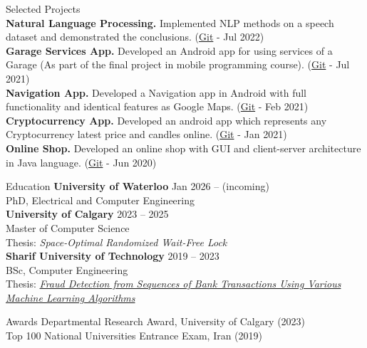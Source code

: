 \documentclass{resume}
\begin{document}
\begin{rSection}{Selected Projects}
\\
\textbf{Natural Language Processing.} Implemented NLP methods on a speech dataset and demonstrated the conclusions. (\href{https://github.com/kahbodaeini/MIR_NLP}{Git} - Jul 2022)
\\
\textbf{Garage Services App.} Developed an Android app for using services of a Garage (As part of the final project in mobile programming course). (\href{https://github.com/kahbodaeini/Garage}{Git} - Jul 2021)
\\
\textbf{Navigation App.} Developed a Navigation app in Android with full functionality and identical features as Google Maps. (\href{https://github.com/kahbodaeini/Navigation_App}{Git} - Feb 2021)
\\
\textbf{Cryptocurrency App.} Developed an android app which represents any Cryptocurrency latest price and candles online. (\href{https://github.com/kahbodaeini/Cryptocurrency_App}{Git} - Jan 2021)
\\
\textbf{Online Shop.} Developed an online shop with GUI and client-server architecture in Java language. (\href{https://github.com/AdvProg2020/Project_team-39}{Git} - Jun 2020)

\end{rSection}

\begin{rSection}{Education}
{\bf University of Waterloo} \hfill Jan 2026 -- (incoming) \\
PhD, Electrical and Computer Engineering
\\
{\bf University of Calgary} \hfill 2023 -- 2025 \\
Master of Computer Science \\
Thesis: \textit{Space-Optimal Randomized Wait-Free Lock}
\\
{\bf Sharif University of Technology} \hfill 2019 -- 2023 \\
BSc, Computer Engineering \\
Thesis: \href{https://github.com/kahbodaeini/Fraud-Detection}{\textit{Fraud Detection from Sequences of Bank Transactions Using Various Machine Learning Algorithms}}
\end{rSection}

\begin{rSection}{Awards}
Departmental Research Award, University of Calgary (2023) \\
Top 100 National Universities Entrance Exam, Iran (2019)
\end{rSection}
\end{document}
